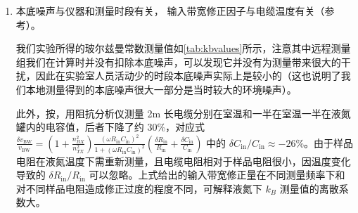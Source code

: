 \begin{enumerate}
	\item 本底噪声与仪器和测量时段有关， 输入带宽修正因子与电缆温度有关（参考\cite{c}）。
	
	我们实验所得的玻尔兹曼常数测量值如\cref{tab:kbvalues}所示，注意其中远程测量组我们在计算时并没有扣除本底噪声，可以发现它并没有为测量带来很大的干扰，因此在实验室人员活动少的时段本底噪声实际上是较小的（这也说明了我们本地测量得到的本底噪声很大一部分是当时较大的环境噪声）。
	
	此外，按\cite{c}，用阻抗分析仪测量 2m 长电缆分别在室温和一半在室温一半在液氮罐内的电容值，后者下降了约 30\%，对应式 $
	\frac{\delta v_{\text{BW}}}{v_{\text{BW}}} = 
	\left( 1 + \frac{n_{BX}^2}{n_{TX}^2} \right)
	\frac{ \left( \omega R_{\text{in}} C_{\text{in}} \right)^2 }{ 1 + \left( \omega R_{\text{in}} C_{\text{in}} \right)^2 }
	\left( \frac{\delta R_{\text{in}}}{R_{\text{in}}} + \frac{\delta C_{\text{in}}}{C_{\text{in}}} \right) $ 中的 $\delta C_{\text{in}} / C_{\text{in}} \approx -26\%$。由于样品电阻在液氮温度下需重新测量，且电缆电阻相对于样品电阻很小，因温度变化导致的 $\delta R_{\text{in}} / R_{\text{in}}$ 可以忽略。上式给出的输入带宽修正量在不同测量频率下和对不同样品电阻造成修正过度的程度不同，可解释液氮下 $k_B$ 测量值的离散系数大。
	
\end{enumerate}



